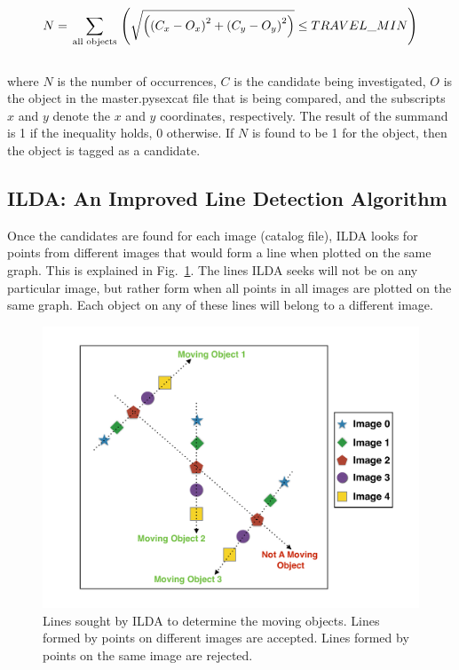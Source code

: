 \documentclass[review]{elsarticle}
\begin{document}
\begin{equation}
 N = \sum_{\begin{smallmatrix}\scriptsize \mbox{all objects}  \end{smallmatrix}} \left( \sqrt{\left( \left( C_x - O_x \right) ^ 2 + \left( C_y - O_y \right) ^ 2 \right)} \leq TRAVEL\_MIN \right)
\end{equation}
\\
\noindent
where $N$ is the number of occurrences, $C$ is the candidate being investigated, $O$ is the object in the master.pysexcat file that is being compared, and the subscripts $x$ and $y$ denote the $x$ and $y$ coordinates, respectively. The result of the summand is 1 if the inequality holds, 0 otherwise. If $N$ is found to be 1 for the object, then the object is tagged as a candidate.

\subsection{ILDA: An Improved Line Detection Algorithm}

Once the candidates are found for each image (catalog file), ILDA looks for points from different images that would form a line when plotted on the same graph. This is explained in Fig.~\ref{fig:objects}. The lines ILDA seeks will not be on any particular image, but rather form when all points in all images are plotted on the same graph. Each object on any of these lines will belong to a different image.

\begin{figure}[!h]
  \centering
  \includegraphics[width=1.0\textwidth]{figure_2_objects}
  \caption{Lines sought by ILDA to determine the moving objects. Lines formed by points on different images are accepted. Lines formed by points on the same image are rejected.}
  \label{fig:objects}
\end{figure}
\end{document}
